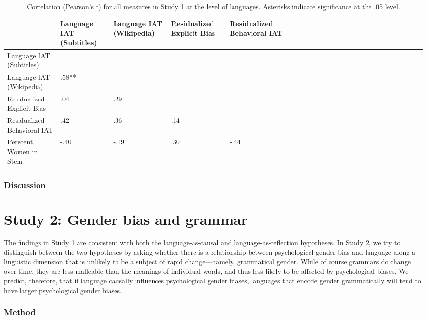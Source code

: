 \documentclass[man,floatsintext]{apa6}
\theoremstyle{definition}
\theoremstyle{definition}
\theoremstyle{definition}
\theoremstyle{remark}
\begin{document}
\begin{table}

\caption{\label{tab:corrtable}Correlation (Pearson's r) for all measures in Study 1 at the level of languages. Asterisks indicate significance at the .05 level.}
\centering
\fontsize{10}{12}\selectfont
\begin{tabular}[t]{l>{\raggedleft\arraybackslash}p{2.5cm}>{\raggedleft\arraybackslash}p{2.5cm}>{\raggedleft\arraybackslash}p{2.5cm}>{\raggedleft\arraybackslash}p{2.5cm}lrrrrlrrrrlrrrrlrrrr}
\toprule
 & Language IAT
(Subtitles) & Language IAT 
 (Wikipedia) & Residualized 
Explicit Bias & Residualized 
Behavioral IAT\\
\midrule
Language IAT (Subtitles) &  &  &  & \\
Language IAT (Wikipedia) & .58** &  &  & \\
Residualized Explicit Bias & .04 & .29 &  & \\
Residualized Behavioral IAT & .42 & .36 & .14 & \\
Perecent Women in Stem & -.40 & -.19 & .30 & -.44\\
\bottomrule
\end{tabular}
\end{table}

\subsubsection{Discussion}\label{discussion}

\section{Study 2: Gender bias and
grammar}\label{study-2-gender-bias-and-grammar}

The findings in Study 1 are consistent with both the language-as-causal
and language-as-reflection hypotheses. In Study 2, we try to distinguish
between the two hypotheses by asking whether there is a relationship
between psychological gender bias and language along a linguistic
dimension that is unlikely to be a subject of rapid change---namely,
grammatical gender. While of course grammars do change over time, they
are less malleable than the meanings of individual words, and thus less
likely to be affected by psychological biases. We predict, therefore,
that if language causally influences psychological gender biases,
languages that encode gender grammatically will tend to have larger
psychological gender biases.

\subsubsection{Method}\label{method}
\end{document}
